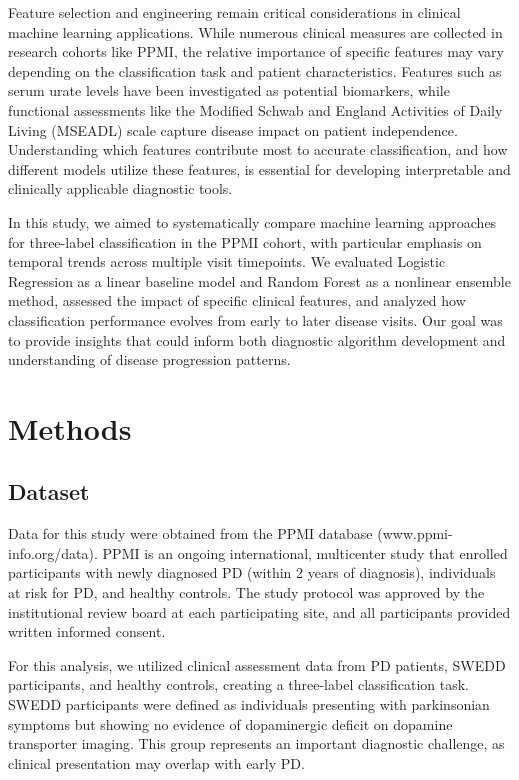 \documentclass[12pt,a4paper]{article}
\begin{document}
Feature selection and engineering remain critical considerations in clinical machine learning applications. While numerous clinical measures are collected in research cohorts like PPMI, the relative importance of specific features may vary depending on the classification task and patient characteristics. Features such as serum urate levels have been investigated as potential biomarkers, while functional assessments like the Modified Schwab and England Activities of Daily Living (MSEADL) scale capture disease impact on patient independence. Understanding which features contribute most to accurate classification, and how different models utilize these features, is essential for developing interpretable and clinically applicable diagnostic tools.

In this study, we aimed to systematically compare machine learning approaches for three-label classification in the PPMI cohort, with particular emphasis on temporal trends across multiple visit timepoints. We evaluated Logistic Regression as a linear baseline model and Random Forest as a nonlinear ensemble method, assessed the impact of specific clinical features, and analyzed how classification performance evolves from early to later disease visits. Our goal was to provide insights that could inform both diagnostic algorithm development and understanding of disease progression patterns.

\section{Methods}

\subsection{Dataset}

Data for this study were obtained from the PPMI database (www.ppmi-info.org/data). PPMI is an ongoing international, multicenter study that enrolled participants with newly diagnosed PD (within 2 years of diagnosis), individuals at risk for PD, and healthy controls. The study protocol was approved by the institutional review board at each participating site, and all participants provided written informed consent.

For this analysis, we utilized clinical assessment data from PD patients, SWEDD participants, and healthy controls, creating a three-label classification task. SWEDD participants were defined as individuals presenting with parkinsonian symptoms but showing no evidence of dopaminergic deficit on dopamine transporter imaging. This group represents an important diagnostic challenge, as clinical presentation may overlap with early PD.
\end{document}

